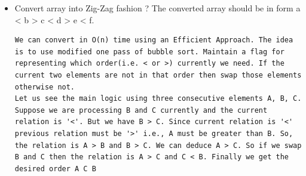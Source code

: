 \documentclass[a4paper,11pt,twoside]{book}
\begin{document}
\begin{itemize}
\item Convert array into Zig-Zag fashion ? The converted array should be in form a < b > c < d > e < f. 
\begin{lstlisting}[breaklines]
We can convert in O(n) time using an Efficient Approach. The idea is to use modified one pass of bubble sort. Maintain a flag for representing which order(i.e. < or >) currently we need. If the current two elements are not in that order then swap those elements otherwise not.
Let us see the main logic using three consecutive elements A, B, C. Suppose we are processing B and C currently and the current relation is '<'. But we have B > C. Since current relation is '<' previous relation must be '>' i.e., A must be greater than B. So, the relation is A > B and B > C. We can deduce A > C. So if we swap B and C then the relation is A > C and C < B. Finally we get the desired order A C B
\end{lstlisting}

\end{itemize}
\end{document}
